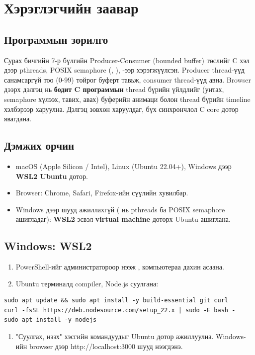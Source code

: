 \documentclass[12pt,a4paper]{article}
\begin{document}
\makecover
\tableofcontents
\clearpage

\section{Хэрэглэгчийн заавар}

\subsection{Программын зорилго}
Сурах бичгийн 7-р бүлгийн Producer-Consumer (bounded buffer) төслийг C хэл дээр pthreads, POSIX semaphore (, ), -ээр хэрэгжүүлсэн. Producer thread-үүд санамсаргүй тоо (0-99) тойрог буферт тавьж, consumer thread-үүд авна. Browser дээрх дэлгэц нь \textbf{бодит C программын} thread бүрийн үйлдлийг (унтах, semaphore хүлээх, тавих, авах) буферийн анимаци болон thread бүрийн timeline хэлбэрээр харуулна. Дэлгэц зөвхөн харуулдаг, бүх синхрончлол C core дотор явагдана.

\subsection{Дэмжих орчин}
\begin{itemize}
  \item macOS (Apple Silicon / Intel), Linux (Ubuntu 22.04+), Windows дээр \textbf{WSL2 Ubuntu} дотор.
  \item Browser: Chrome, Safari, Firefox-ийн сүүлийн хувилбар.
  \item Windows дээр шууд ажиллахгүй ( нь pthreads ба POSIX semaphore ашигладаг): \textbf{WSL2} эсвэл \textbf{virtual machine} доторх Ubuntu ашиглана.
\end{itemize}

\subsection{Windows: WSL2}
\begin{enumerate}
  \item PowerShell-ийг администратороор нээж , компьютераа дахин асаана.
  \item Ubuntu терминалд compiler, Node.js суулгана:
\end{enumerate}
\begin{lstlisting}[style=shell,breaklines=true]
sudo apt update && sudo apt install -y build-essential git curl
curl -fsSL https://deb.nodesource.com/setup_22.x | sudo -E bash -
sudo apt install -y nodejs
\end{lstlisting}
\begin{enumerate}[start=3]
  \item "Суулгах, нээх" хэсгийн командуудыг Ubuntu дотор ажиллуулна. Windows-ийн browser дээр http://localhost:3000 шууд нээгдэнэ.
\end{enumerate}
\end{document}

